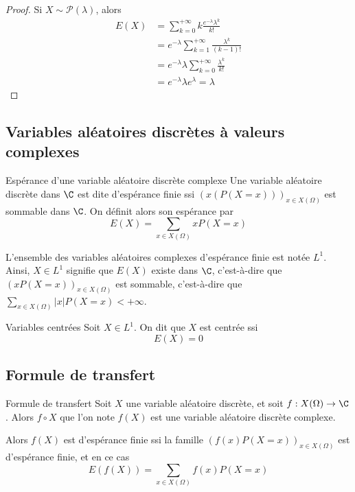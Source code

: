 \begin{proof}
    Si $X \sim \mathcal P(\lambda)$, alors 
    \begin{align}
        E(X) & = \sum_{k = 0}^{+ \infty} k \frac{e^{- \lambda} \lambda^k}{k!} \\
        & = e^{- \lambda} \sum_{k = 1}^{+ \infty} \frac{\lambda^k}{(k - 1)!} \\
        & = e^{- \lambda} \lambda \sum_{k = 0}^{+ \infty} \frac{\lambda^k}{k!} \\
        & = e^{- \lambda} \lambda e^{\lambda} = \lambda
    \end{align}
\end{proof}

\subsection{Variables aléatoires discrètes à valeurs complexes}

\begin{definition}{Espérance d'une variable aléatoire discrète complexe}{}
    Une variable aléatoire discrète dans $\C$ est dite d'espérance finie ssi 
    $(x(P(X = x)))_{x \in X(\Omega)}$ est sommable dans $\C$. On définit alors 
    son espérance par 
    $$ E(X) = \sum_{x \in X(\Omega)} x P(X = x) $$

    L'ensemble des variables aléatoires complexes d'espérance finie est notée $L^1$.
    Ainsi, $X \in L^1$ signifie que $E(X)$ existe dans $\C$, c'est-à-dire que 
    $(x P(X = x))_{x \in X(\Omega)}$ est sommable, c'est-à-dire que 
    $\displaystyle \sum_{x \in X(\Omega)} |x| P(X = x) < + \infty   $.
\end{definition}

\begin{definition}{Variables centrées}{}
    Soit $X \in L^1$. On dit que $X$ est centrée ssi 
    $$ E(X) = 0 $$    
\end{definition}

\subsection{Formule de transfert}

\begin{theoreme}{Formule de transfert}{}
    Soit $X$ une variable aléatoire discrète, et soit $f : X(\Omega) \to \C$.
    Alors $f \circ X$ que l'on note $f(X)$ est une variable aléatoire discrète complexe. 

    Alors $f(X)$ est d'espérance finie ssi la famille $(f(x) P(X = x))_{x \in X(\Omega)}$ 
    est d'espérance finie, et en ce cas
    $$ E(f(X)) = \sum_{x \in X(\Omega)} f(x) P(X = x) $$
\end{theoreme}

